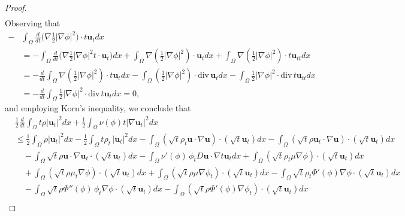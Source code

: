 \documentclass[11pt]{article}
\numberwithin{equation}{section}
\begin{document}
\begin{proof}
\begin{align*}
\end{align*}
Observing that
\begin{align*}
-&\int_{\Omega} \frac{d}{dt} \big( \nabla  \frac{1}{2} |\nabla \phi|^2\big)\cdot  t \mathbf{u}_tdx
\\&= -\int_{\Omega} \frac{d}{dt} \big( \nabla  \frac{1}{2} |\nabla \phi|^2 t \cdot \mathbf{u}_t\big) dx
+\int_{\Omega}\nabla( \frac{1}{2} |\nabla \phi|^2) \cdot\mathbf{u}_tdx
+\int_{\Omega} \nabla( \frac{1}{2} |\nabla \phi|^2 ) \cdot t\mathbf{u}_{tt}dx \\
&= -\frac{d}{dt}  \int_{\Omega}\nabla  (\frac{1}{2} |\nabla \phi|^2 )\cdot t \mathbf{u}_tdx
- \int_{\Omega}  ( \frac{1}{2} |\nabla \phi|^2 )\cdot\text{div} \, \mathbf{u}_tdx
- \int_{\Omega}   \frac{1}{2} |\nabla \phi|^2 \cdot\text{div} \, t \mathbf{u}_{tt}dx  \\
&=-\frac{d}{dt} \int_{\Omega}  \frac{1}{2} |\nabla \phi|^2 \cdot\text{div} \, t \mathbf{u}_t dx= 0,
\end{align*}
and employing  Korn's inequality, we conclude that
\begin{equation}
\begin{split}
&\frac{1}{2} \frac{d}{dt} \int_{\Omega} t\rho |\mathbf{u}_t|^2 dx + \frac{1}{2} \int_{\Omega} \nu(\phi) t|\nabla \mathbf{u}_t|^2 dx\label{eq-31} \\
&\leq \frac{1}{2} \int_{\Omega} \rho |\mathbf{u}_t|^2dx - \frac{1}{2} \int_{\Omega} t\rho_t \, |\mathbf{u}_t|^2dx - \int_{\Omega} \left( \sqrt{t} \rho_t \mathbf{u} \cdot \nabla \mathbf{u} \right)\cdot \left( \sqrt{t} \mathbf{u}_t \right) dx- \int_{\Omega} \left( \sqrt{t} \rho \mathbf{u}_t \cdot \nabla \mathbf{u} \right) \cdot\left( \sqrt{t} \mathbf{u}_t \right) dx \\
&\quad- \int_{\Omega} \sqrt{t} \rho \mathbf{u} \cdot \nabla \mathbf{u}_t \cdot\left( \sqrt{t} \mathbf{u}_t \right) dx - \int_{\Omega}\nu'(\phi) \, \phi_t D\mathbf{u} \cdot \nabla t \mathbf{u}_tdx + \int_{\Omega} \left( \sqrt{t} \rho_t \mu \nabla \phi \right) \cdot\left( \sqrt{t} \mathbf{u}_t \right) dx \\
&\quad+ \int_{\Omega} \left( \sqrt{t} \rho \mu_t \nabla \phi \right)\cdot \left( \sqrt{t} \mathbf{u}_t \right) dx + \int_{\Omega} \left( \sqrt{t} \rho \mu \nabla \phi_t \right) \cdot\left( \sqrt{t} \mathbf{u}_t \right) dx - \int_{\Omega} \sqrt{t} \rho_t \Phi'(\phi) \nabla \phi\cdot \left( \sqrt{t} \mathbf{u}_t \right) dx \\
&\quad- \int_{\Omega} \sqrt{t}  \rho \Phi''(\phi) \, \phi_t \nabla \phi\cdot \left( \sqrt{t}\mathbf{u}_t \right) dx - \int_{\Omega} \left( \sqrt{t}  \rho \Phi'(\phi) \nabla \phi_t \right)\cdot \left( \sqrt{t} \mathbf{u}_t \right)dx\\

\end{split}
\end{equation}
\end{proof}
\end{document}

